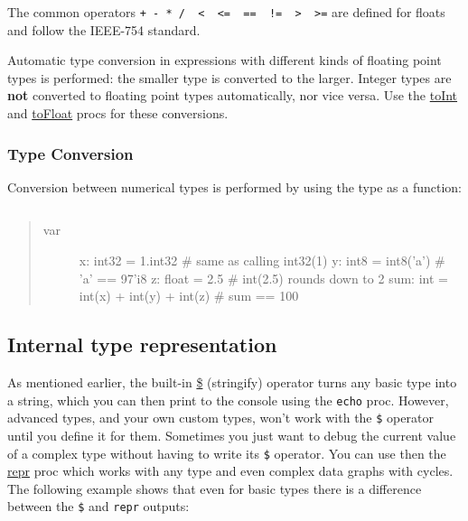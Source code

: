 The common operators
\texttt{+\ -\ *\ /\ \ \textless{}\ \ \textless{}=\ \ ==\ \ !=\ \ \textgreater{}\ \ \textgreater{}=}
are defined for floats and follow the IEEE-754 standard.

Automatic type conversion in expressions with different kinds of
floating point types is performed: the smaller type is converted to the
larger. Integer types are \textbf{not} converted to floating point types
automatically, nor vice versa. Use the
\href{system.html\#toInt,float}{toInt} and
\href{system.html\#toFloat,int}{toFloat} procs for these conversions.

\hypertarget{type-conversion}{%
\subsubsection{Type Conversion}\label{type-conversion}}

Conversion between numerical types is performed by using the type as a
function:

\begin{verbatim}
\end{verbatim}

\begin{quote}
\begin{description}
\item[var]
x: int32 = 1.int32 \# same as calling int32(1) y: int8 = int8('a') \#
'a' == 97'i8 z: float = 2.5 \# int(2.5) rounds down to 2 sum: int =
int(x) + int(y) + int(z) \# sum == 100
\end{description}
\end{quote}

\hypertarget{internal-type-representation}{%
\subsection{Internal type
representation}\label{internal-type-representation}}

As mentioned earlier, the built-in \href{dollars.html}{\$} (stringify)
operator turns any basic type into a string, which you can then print to
the console using the \texttt{echo} proc. However, advanced types, and
your own custom types, won't work with the \texttt{\$} operator until
you define it for them. Sometimes you just want to debug the current
value of a complex type without having to write its \texttt{\$}
operator. You can use then the \href{system.html\#repr,T}{repr} proc
which works with any type and even complex data graphs with cycles. The
following example shows that even for basic types there is a difference
between the \texttt{\$} and \texttt{repr} outputs:

